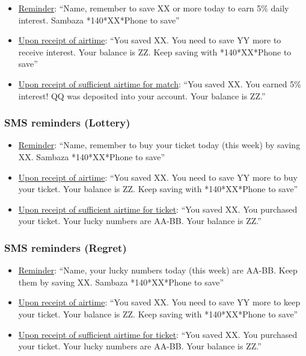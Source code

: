 \documentclass[11pt]{article}
\begin{document}
            \begin{itemize}
                \item \underline{Reminder}: ``{Name}, remember to save XX or more today to earn 5\% daily interest. Sambaza *140*XX*Phone to save''
                \item \underline{Upon receipt of airtime}: ``You saved XX. You need to save YY more to receive interest. Your balance is ZZ. Keep saving with *140*XX*Phone to save''
                \item \underline{Upon receipt of sufficient airtime for match}: ``You saved XX. You earned 5\% interest!  QQ was deposited into your account. Your balance is ZZ.''
            \end{itemize}

        \subsubsection{SMS reminders (Lottery)}

            \begin{itemize}
                \item \underline{Reminder}: ``{Name}, remember to buy your ticket today (this week) by saving XX. Sambaza *140*XX*Phone to save''
                \item \underline{Upon receipt of airtime}: ``You saved XX. You need to save YY more to buy your ticket. Your balance is ZZ. Keep saving with *140*XX*Phone to save''
                \item \underline{Upon receipt of sufficient airtime for ticket}: ``You saved XX. You purchased your ticket. Your lucky numbers are AA-BB. Your balance is ZZ.''
            \end{itemize}

        \subsubsection{SMS reminders (Regret)}

            \begin{itemize}
                \item \underline{Reminder}: ``{Name}, your lucky numbers today (this week) are AA-BB. Keep them by saving XX. Sambaza *140*XX*Phone to save''
                \item \underline{Upon receipt of airtime}: ``You saved XX. You need to save YY more to keep your ticket. Your balance is ZZ. Keep saving with *140*XX*Phone to save''
                \item \underline{Upon receipt of sufficient airtime for ticket}: ``You saved XX. You purchased your ticket. Your lucky numbers are AA-BB. Your balance is ZZ.''
            \end{itemize}
\end{document}
